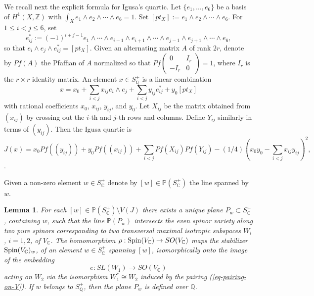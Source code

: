 \documentclass[12pt]{amsart}
\numberwithin{equation}{subsection}
\theoremstyle{plain}
\newtheorem{lem}[thm]{Lemma}
\theoremstyle{definition}
\newcommand{\CC}{{\mathbb C}}
\newcommand{\QQ}{{\mathbb Q}}
\newcommand{\PP}{{\mathbb P}}
\newcommand{\Integers}{{\mathbb Z}}
\newcommand{\Spin}{{\rm Spin}}
\begin{document}
We recall next the explicit formula for Igusa's quartic.
Let $\{e_1, \dots, e_6\}$ be a basis of $H^1(X,\Integers)$ with
$\int_X e_1\wedge e_2\wedge \cdots\wedge e_6=1$.
Set $[pt_X]:=e_1\wedge e_2\wedge \cdots\wedge e_6$.
For $1\leq i<j\leq 6$, set 
\[
e_{ij}^*:=(-1)^{i+j-1}e_1\wedge \cdots \wedge e_{i-1}\wedge e_{i+1} \wedge \cdots \wedge e_{j-1}\wedge e_{j+1}\wedge \cdots \wedge e_6,
\]
so that $e_i\wedge e_j\wedge e_{ij}^*=[pt_X]$. Given an alternating matrix $A$ of rank $2r$, denote by $Pf(A)$ the Pfaffian of $A$ normalized so that $Pf\left(\begin{array}{cc}0 & I_r\\-I_r & 0\end{array}\right)=1$,
where $I_r$ is the $r\times r$ identity matrix. An element $x\in S^+_\QQ$ is a linear combination
\[
x=x_0+\sum_{i<j}x_{ij}e_i\wedge e_j+\sum_{i<j}y_{ij}e_{ij}^*+y_0[pt_X]
\]
with rational coefficients $x_0$, $x_{ij}$, $y_{ij}$, and $y_0$.
Let $X_{ij}$ be the matrix obtained from $(x_{ij})$ by crossing out the $i$-th and $j$-th rows and columns. 
Define $Y_{ij}$ similarly in terms of $(y_{ij})$.
Then the Igusa quartic is
\begin{equation}
\label{eq-J}
J(x)=
x_0Pf((y_{ij})) + y_0Pf((x_{ij})) + \sum_{i<j}Pf(X_{ij})Pf(Y_{ij})-(1/4)(x_0y_0-\sum_{i<j}x_{ij}y_{ij})^2,
\end{equation}
\cite[Prop. 3]{igusa}.







Given a non-zero element $w\in S^+_\CC$ denote by $[w]\in\PP(S^+_\CC)$ the line spanned by $w$.

\begin{lem}
\label{lemma-secant-to-spinor-variety}
For each $[w]\in \PP(S^+_\CC)\setminus V(J)$ there exists a unique plane
$P_w\subset S^+_\CC$, containing $w$, such that the line $\PP(P_w)$ 
intersects the even spinor variety along two pure spinors corresponding to two transversal maximal isotropic subspaces $W_i$, $i=1,2$, of $V_\CC$. 
The homomorphism $\rho:\Spin(V_\CC)\rightarrow SO(V_\CC)$ maps the
stabilizer $\Spin(V_\CC)_w$, of an element $w\in S^+_\CC$ spanning $[w]$, isomorphically onto the image of the embedding 
\begin{equation}
\label{eq-embedding-e-of-stabilizer-of-w}
e:SL(W_1)\rightarrow SO(V_\CC)
\end{equation}
acting on $W_2$ via the isomorphism $W_1^*\cong W_2$ induced  by the pairing (\ref{eq-pairing-on-V}). If $w$ belongs to $S^+_\QQ$, then the plane $P_w$ is defined over $\QQ$.
\end{lem}
\end{document}
